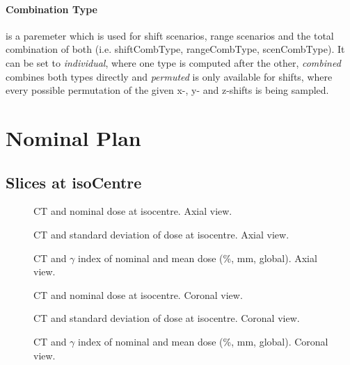 \documentclass[a4paper]{scrartcl}
\begin{document}
\paragraph{Combination Type} is a paremeter which is used for shift scenarios, range scenarios and the total combination of both (i.e. shiftCombType, rangeCombType, scenCombType).
It can be set to \textit{individual}, where one type is computed after the other, \textit{combined} combines both types directly and \textit{permuted} is only available for shifts, where every possible permutation of the given x-, y- and z-shifts is being sampled.






\FloatBarrier
\newpage

\section{Nominal Plan}
\subsection{Slices at isoCentre}
\begin{figure}[!b]
  \centering
  
  \caption{CT and nominal dose at isocentre. Axial view.}
\end{figure}

\begin{figure}[!b]
  \centering
  
  \caption{CT and standard deviation of dose at isocentre. Axial view.}
\end{figure}

\begin{figure}[!b]
  \centering
  
  \caption{CT and $\gamma$ index of nominal and mean dose (\gammaDoseAgreement \%, \gammaDoseAgreement mm, global). Axial view.}
\end{figure}

\begin{figure}[!b]
  \centering
  
  \caption{CT and nominal dose at isocentre. Coronal view.}
\end{figure}

\begin{figure}[!b]
  \centering
  
  \caption{CT and standard deviation of dose at isocentre. Coronal view.}
\end{figure}

\begin{figure}[!b]
  \centering
  
  \caption{CT and $\gamma$ index of nominal and mean dose (\gammaDoseAgreement \%, \gammaDoseAgreement mm, global). Coronal view.}
\end{figure}
\end{document}
